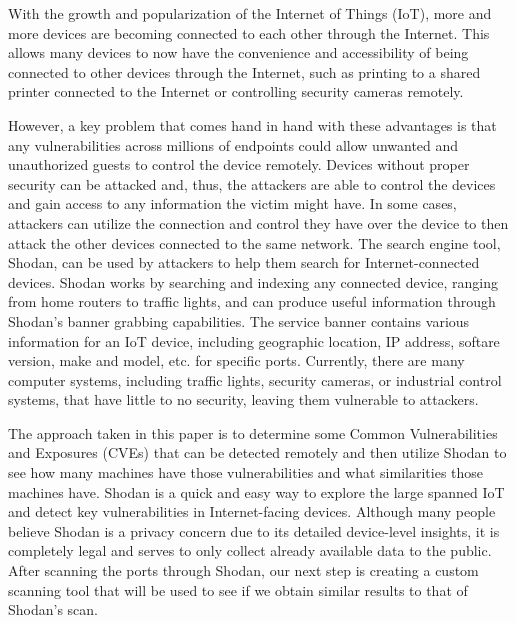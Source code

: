 With the growth and popularization of the Internet of Things (IoT),
more and more devices are becoming connected to each other through the Internet. 
This allows many devices to now have the convenience and accessibility of being 
connected to other devices through the Internet, such as printing to a
shared printer connected to the Internet or controlling security cameras
remotely.

However, a key problem that comes hand in hand with these advantages is that
any vulnerabilities across millions of endpoints could allow unwanted and
unauthorized guests to control the device remotely. Devices without proper
security can be attacked and, thus, the attackers are able to control the 
devices and gain access to any information the victim might have. In some cases,
attackers can utilize the connection and control they have over the device to then 
attack the other devices connected to the same network. The search engine tool, Shodan, can
be used by attackers to help them search for Internet-connected devices. Shodan works by
searching and indexing any connected device, ranging from home routers to traffic lights, and can produce
useful information through Shodan's banner grabbing capabilities. The service banner
contains various information for an IoT device, including geographic location, 
IP address, softare version, make and model, etc. for specific ports. 
Currently, there are many computer systems, including traffic lights, security cameras,
or industrial control systems, that have little to no security, leaving them vulnerable to attackers\cite{afit//CSAR-10-025-01}.

The approach taken in this paper is to determine some Common Vulnerabilities
and Exposures (CVEs) that can be detected remotely and then utilize Shodan
to see how many machines have those vulnerabilities and what similarities
those machines have. Shodan is a quick and easy way to explore the large
spanned IoT and detect key vulnerabilities in Internet-facing devices.
Although many people believe Shodan is a privacy concern due to its detailed
device-level insights, it is completely legal and serves to only collect
already available data to the public. After scanning the ports through Shodan,
our next step is creating a custom scanning tool that will be used to see if we obtain
similar results to that of Shodan's scan. 

